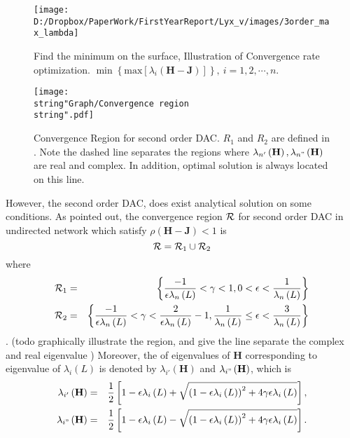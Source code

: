 \begin{figure}
\hfill{}\texttt{[image: D:/Dropbox/PaperWork/FirstYearReport/Lyx\_v/images/3order\_max\_lambda]}\hfill{}\hfill{}\caption{\label{fig:Find-minimum-rho(H)} Find the minimum on the surface,
Illustration of Convergence rate optimization. $\min\left\{ \mbox{max}\left[\lambda_{i}\left(\mathbf{H-J}\right)\right]\right\} ,\: i=1,2,\cdots,n$. }
\end{figure}


\begin{figure}
\hfill{}\texttt{[image: \\string"Graph/Convergence region\\string".pdf]}\hfill{}\hfill{}\caption{\label{fig:Convergence-Region}Convergence Region for second order
DAC. $R_{1}$ and $R_{2}$ are defined in .
Note the dashed line separates the regions where $\lambda_{n'}\left(\mathbf{H}\right),\lambda_{n"}\left(\mathbf{H}\right)$
are real and complex. In addition, optimal solution is always located
on this line. }
\end{figure}


However, the second order DAC, does exist analytical solution on some
conditions. As \cite{Xiong2009a} pointed out, the convergence region
${\cal R}$ for second order DAC in undirected network which satisfy
$\rho\left(\mathbf{H}-\mathbf{J}\right)<1$ is
\[
{\cal R}={\cal R}_{1}\cup{\cal R}_{2}
\]
where 
\begin{eqnarray}
{\cal R}_{1} & = & \left\{ \frac{-1}{\epsilon\lambda_{n}\left(L\right)}<\gamma<1,0<\epsilon<\frac{1}{\lambda_{n}\left(L\right)}\right\} \\
{\cal R}_{2} & = & \left\{ \frac{-1}{\epsilon\lambda_{n}\left(L\right)}<\gamma<\frac{2}{\epsilon\lambda_{n}\left(L\right)}-1,\frac{1}{\lambda_{n}\left(L\right)}\leq\epsilon<\frac{3}{\lambda_{n}\left(L\right)}\right\} \label{eq:Def Convergence region R1 R2}
\end{eqnarray}
 . (todo graphically illustrate the region, and give the line separate
the complex and real eigenvalue ) Moreover, the of eigenvalues of
$\mathbf{H}$ corresponding to eigenvalue of $\lambda_{i}\left(L\right)$
is denoted by $\lambda_{i'}\left(\mathbf{H}\right)$ and $\lambda_{i"}\left(\mathbf{H}\right)$,
which is 
\begin{eqnarray}
\lambda_{i'}\left(\mathbf{H}\right) & = & \frac{1}{2}\left[1-\epsilon\lambda_{i}\left(L\right)+\sqrt{\left(1-\epsilon\lambda_{i}\left(L\right)\right)^{2}+4\gamma\epsilon\lambda_{i}\left(L\right)}\right],\nonumber \\
\lambda_{i"}\left(\mathbf{H}\right) & = & \frac{1}{2}\left[1-\epsilon\lambda_{i}\left(L\right)-\sqrt{\left(1-\epsilon\lambda_{i}\left(L\right)\right)^{2}+4\gamma\epsilon\lambda_{i}\left(L\right)}\right].\label{eq:2nd-DAC lambda_H solution}
\end{eqnarray}
 

